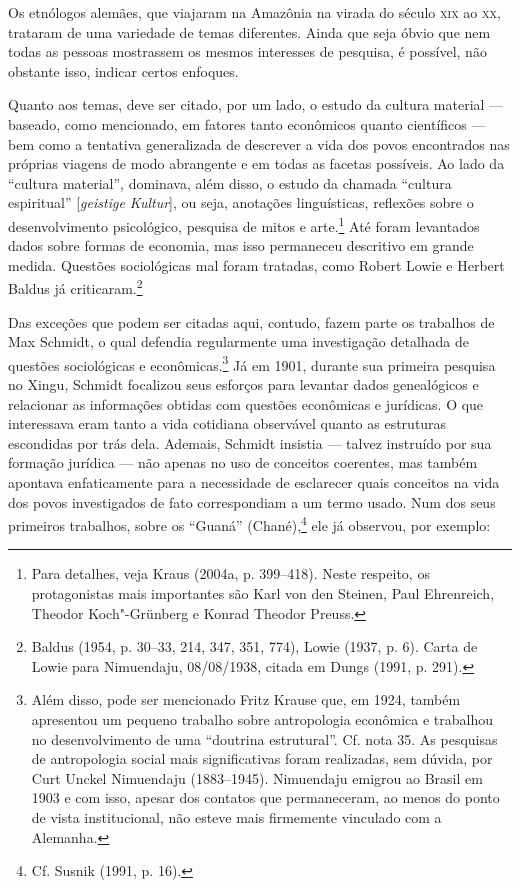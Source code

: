 Os etnólogos alemães, que viajaram na Amazônia na virada do século \textsc{xix}
ao \textsc{xx}, trataram de uma variedade de temas diferentes. Ainda que seja
óbvio que nem todas as pessoas mostrassem os mesmos interesses de
pesquisa, é possível, não obstante isso, indicar certos enfoques.

Quanto aos temas, deve ser citado, por um lado, o estudo da cultura
material --- baseado, como mencionado, em fatores tanto econômicos quanto
científicos --- bem como a tentativa generalizada de descrever a vida dos
povos encontrados nas próprias viagens de modo abrangente e em todas as
facetas possíveis. Ao lado da ``cultura material'', dominava, além
disso, o estudo da chamada ``cultura espiritual'' {[}\emph{geistige
Kultur}{]}, ou seja, anotações linguísticas, reflexões sobre o
desenvolvimento psicológico, pesquisa de mitos e arte.\footnote{Para
  detalhes, veja Kraus (2004a, p. 399--418). Neste respeito, os
  protagonistas mais importantes são Karl von den Steinen, Paul
  Ehrenreich, Theodor Koch"-Grünberg e Konrad Theodor Preuss.} Até foram
levantados dados sobre formas de economia, mas isso permaneceu
descritivo em grande medida. Questões sociológicas mal foram tratadas,
como Robert Lowie e Herbert Baldus já criticaram.\footnote{Baldus (1954,
  p. 30--33, 214, 347, 351, 774), Lowie (1937, p. 6). Carta de Lowie para
  Nimuendaju, 08/08/1938, citada em Dungs (1991, p. 291).}

Das exceções que podem ser citadas aqui, contudo, fazem parte os
trabalhos de Max Schmidt, o qual defendia regularmente uma investigação
detalhada de questões sociológicas e econômicas.\footnote{Além disso,
  pode ser mencionado Fritz Krause que, em 1924, também apresentou um
  pequeno trabalho sobre antropologia econômica e trabalhou no
  desenvolvimento de uma ``doutrina estrutural''. Cf. nota 35. As
  pesquisas de antropologia social mais significativas foram realizadas,
  sem dúvida, por Curt Unckel Nimuendaju (1883--1945). Nimuendaju
  emigrou ao Brasil em 1903 e com isso, apesar dos contatos que
  permaneceram, ao menos do ponto de vista institucional, não esteve
  mais firmemente vinculado com a Alemanha.} Já em 1901, durante sua
primeira pesquisa no Xingu, Schmidt focalizou seus esforços para
levantar dados genealógicos e relacionar as informações obtidas com
questões econômicas e jurídicas. O que interessava eram tanto a vida
cotidiana observável quanto as estruturas escondidas por trás dela.
Ademais, Schmidt insistia --- talvez instruído por sua formação jurídica
--- não apenas no uso de conceitos coerentes, mas também apontava
enfaticamente para a necessidade de esclarecer quais conceitos na vida
dos povos investigados de fato correspondiam a um termo usado. Num dos
seus primeiros trabalhos, sobre os ``Guaná'' (Chané),\footnote{Cf.
  Susnik (1991, p. 16).} ele já observou, por exemplo:

